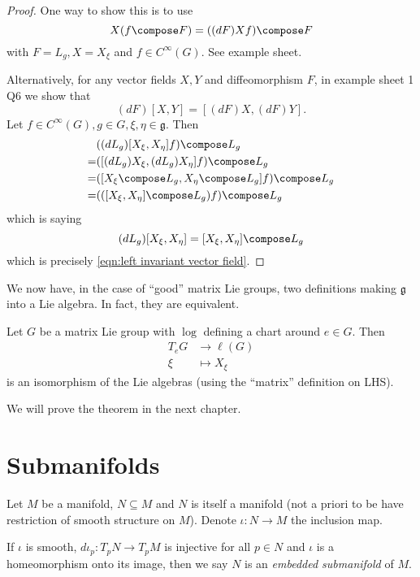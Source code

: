 \documentclass[a4paper]{article}
\begin{document}
\begin{proof}
  One way to show this is to use
  \[
    X(f \compose F) = ((dF) X f) \compose F
  \]
  with \(F = L_g, X = X_\xi\) and \(f \in C^\infty(G)\). See example sheet.

  Alternatively, for any vector fields \(X, Y\) and diffeomorphism \(F\), in example sheet 1 Q6 we show that
  \[
    (dF) [X, Y] = [(dF) X, (dF) Y].
  \]
  Let \(f \in C^\infty(G), g \in G, \xi, \eta \in \mathfrak g\). Then
  \begin{align*}
    & ((dL_g) [X_\xi, X_\eta] f) \compose L_g \\
    =& ([(dL_g) X_\xi, (dL_g) X_\eta] f) \compose L_g \\
    =& ([X_\xi \compose L_g, X_\eta \compose L_g] f) \compose L_g \\
    =& (([X_\xi, X_\eta] \compose L_g) f) \compose L_g
  \end{align*}
  which is saying
  \[
    (dL_g) [X_\xi, X_\eta] = [X_\xi, X_\eta] \compose L_g
  \]
  which is precisely \eqref{eqn:left invariant vector field}.
\end{proof}

We now have, in the case of ``good'' matrix Lie groups, two definitions making \(\mathfrak g\) into a Lie algebra. In fact, they are equivalent.

\begin{theorem}
  Let \(G\) be a matrix Lie group with \(\log\) defining  a chart around \(e \in G\). Then
  \begin{align*}
    T_eG &\to \ell(G) \\
    \xi &\mapsto X_\xi
  \end{align*}
  is an isomorphism of the Lie algebras (using the ``matrix'' definition on LHS).
\end{theorem}
We will prove the theorem in the next chapter.

\section{Submanifolds}

Let \(M\) be a manifold, \(N \subseteq M\) and \(N\) is itself a manifold (not a priori to be have restriction of smooth structure on \(M\)). Denote \(\iota: N \to M\) the inclusion map.

\begin{definition}
  If \(\iota\) is smooth, \(d\iota_p: T_pN \to T_pM\) is injective for all \(p \in N\) and \(\iota\) is a homeomorphism onto its image, then we say \(N\) is an \emph{embedded submanifold} of \(M\).
\end{definition}
\end{document}
